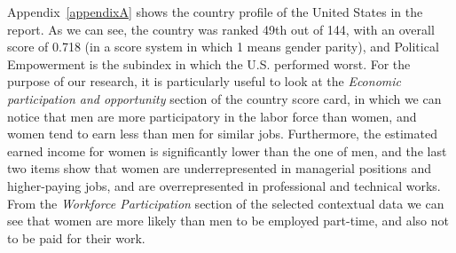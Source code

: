 Appendix~\ref{appendixA} shows the country profile of the United States in the report. As we can see, the country was ranked 49th out of 144, with an overall score of 0.718 (in a score system in which 1 means gender parity), and Political Empowerment is the subindex in which the U.S. performed worst. For the purpose of our research, it is particularly useful to look at the \textit{Economic participation and opportunity} section of the country score card, in which we can notice that men are more participatory in the labor force than women, and women tend to earn less than men for similar jobs. Furthermore, the estimated earned income for women is significantly lower than the one of men, and the last two items show that women are underrepresented in managerial positions and higher-paying jobs, and are overrepresented in professional and technical works. From the \textit{Workforce Participation} section of the selected contextual data we can see that women are more likely than men to be employed part-time, and also not to be paid for their work.

